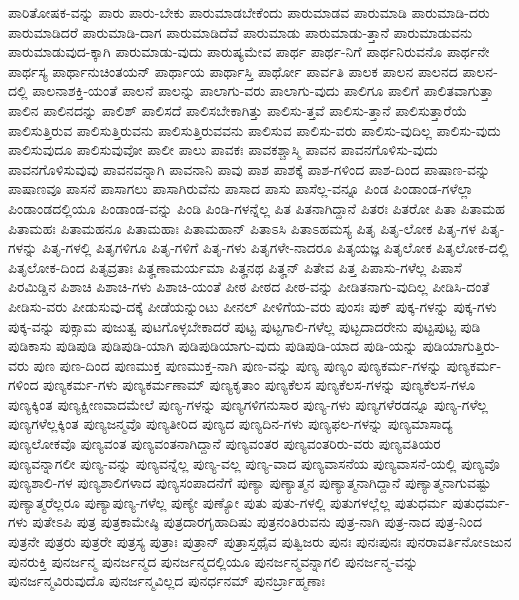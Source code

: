 {ಪಾರಿತೋಷಕ-ವನ್ನು
ಪಾರು
ಪಾರು-ಬೇಕು
ಪಾರುಮಾಡಬೇಕೆಂದು
ಪಾರುಮಾಡವ
ಪಾರುಮಾಡಿ
ಪಾರುಮಾಡಿ-ದರು
ಪಾರುಮಾಡಿದರೆ
ಪಾರುಮಾಡಿ-ದಾಗ
ಪಾರುಮಾಡಿದೆವೆ
ಪಾರುಮಾಡು
ಪಾರುಮಾಡು-ತ್ತಾನೆ
ಪಾರುಮಾಡುವನು
ಪಾರುಮಾಡುವುದ-ಕ್ಕಾಗಿ
ಪಾರುಮಾಡು-ವುದು
ಪಾರುಷ್ಯಮೇವ
ಪಾರ್ಥ
ಪಾರ್ಥ-ನಿಗೆ
ಪಾರ್ಥನಿರುವನೊ
ಪಾರ್ಥನೇ
ಪಾರ್ಥಸ್ಯ
ಪಾರ್ಥಾನುಚಿಂತಯನ್
ಪಾರ್ಥಾಯ
ಪಾರ್ಥಾಸ್ತಿ
ಪಾರ್ಥೋ
ಪಾರ್ವತಿ
ಪಾಲಕ
ಪಾಲನ
ಪಾಲನದ
ಪಾಲನ-ದಲ್ಲಿ
ಪಾಲನಾಶಕ್ತಿ-ಯಂತೆ
ಪಾಲನೆ
ಪಾಲನ್ನು
ಪಾಲಾಗು-ವರು
ಪಾಲಾಗು-ವುದು
ಪಾಲಿಗೂ
ಪಾಲಿಗೆ
ಪಾಲಿತವಾಗುತ್ತಾ
ಪಾಲಿನ
ಪಾಲಿನದನ್ನು
ಪಾಲಿಶ್
ಪಾಲಿಸದೆ
ಪಾಲಿಸಬೇಕಾಗಿತ್ತು
ಪಾಲಿಸು-ತ್ತವೆ
ಪಾಲಿಸು-ತ್ತಾನೆ
ಪಾಲಿಸುತ್ತಾರೆಯೆ
ಪಾಲಿಸುತ್ತಿರುವ
ಪಾಲಿಸುತ್ತಿರುವನು
ಪಾಲಿಸುತ್ತಿರುವವನು
ಪಾಲಿಸುವ
ಪಾಲಿಸು-ವರು
ಪಾಲಿಸು-ವುದಿಲ್ಲ
ಪಾಲಿಸು-ವುದು
ಪಾಲಿಸುವುದೂ
ಪಾಲಿಸುವುವೋ
ಪಾಲೀ
ಪಾಲು
ಪಾವಕಃ
ಪಾವಕಶ್ಚಾಸ್ಮಿ
ಪಾವನ
ಪಾವನಗೊಳಿಸು-ವುದು
ಪಾವನಗೊಳಿಸುವುವು
ಪಾವನವನ್ನಾಗಿ
ಪಾವನಾನಿ
ಪಾವು
ಪಾಶ
ಪಾಶಕ್ಕೆ
ಪಾಶ-ಗಳಿಂದ
ಪಾಶ-ದಿಂದ
ಪಾಷಾಣ-ವನ್ನು
ಪಾಷಾಣವೂ
ಪಾಸನೆ
ಪಾಸಾಗಲು
ಪಾಸಾಗಿರುವೆನು
ಪಾಸಾದ
ಪಾಸು
ಪಾಸೆಲ್ಲ-ವನ್ನೂ
ಪಿಂಡ
ಪಿಂಡಾಂಡ-ಗಳೆಲ್ಲಾ
ಪಿಂಡಾಂಡದಲ್ಲಿಯೂ
ಪಿಂಡಾಂಡ-ವನ್ನು
ಪಿಂಡಿ
ಪಿಂಡಿ-ಗಳನ್ನೆಲ್ಲ
ಪಿತ
ಪಿತನಾಗಿದ್ದಾನೆ
ಪಿತರಃ
ಪಿತರೋ
ಪಿತಾ
ಪಿತಾಮಹ
ಪಿತಾಮಹಃ
ಪಿತಾಮಹನೂ
ಪಿತಾಮಹಾಃ
ಪಿತಾಮಹಾನ್
ಪಿತಾಽಸಿ
ಪಿತಾಽಹಮಸ್ಯ
ಪಿತೃ
ಪಿತೃ-ಲೋಕ
ಪಿತೃ-ಗಳ
ಪಿತೃ-ಗಳನ್ನು
ಪಿತೃ-ಗಳಲ್ಲಿ
ಪಿತೃಗಳಿಗೂ
ಪಿತೃ-ಗಳಿಗೆ
ಪಿತೃ-ಗಳು
ಪಿತೃಗಳೇ-ನಾದರೂ
ಪಿತೃಯಜ್ಞ
ಪಿತೃಲೋಕ
ಪಿತೃಲೋಕ-ದಲ್ಲಿ
ಪಿತೃಲೋಕ-ದಿಂದ
ಪಿತೃವ್ರತಾಃ
ಪಿತೄಣಾಮರ್ಯಮಾ
ಪಿತೄನಥ
ಪಿತೄನ್
ಪಿತೇವ
ಪಿತ್ತ
ಪಿಪಾಸು-ಗಳೆಲ್ಲ
ಪಿಪಾಸೆ
ಪಿರಮಿಡ್ಡಿನ
ಪಿಶಾಚಿ
ಪಿಶಾಚಿ-ಗಳು
ಪಿಶಾಚಿ-ಯಂತೆ
ಪೀಠ
ಪೀಠದ
ಪೀಠ-ವನ್ನು
ಪೀಡಿತನಾಗು-ವುದಿಲ್ಲ
ಪೀಡಿಸಿ-ದಂತೆ
ಪೀಡಿಸು-ವರು
ಪೀಡುಸುವು-ದಕ್ಕೆ
ಪೀಡೆಯನ್ನುಂಟು
ಪೀನಲ್
ಪೀಳಿಗೆಯ-ವರು
ಪುಂಸಃ
ಪುಕ್
ಪುಕ್ಕ-ಗಳನ್ನು
ಪುಕ್ಕ-ಗಳು
ಪುಕ್ಕ-ವನ್ನು
ಪುಕ್ಸಾಮ
ಪುಜುತ್ವ
ಪುಟಗೊಳ್ಳಬೇಕಾದರೆ
ಪುಟ್ಟ
ಪುಟ್ಟಗಾಲಿ-ಗಳೆಲ್ಲ
ಪುಟ್ಟದಾದರೇನು
ಪುಟ್ಟಪುಟ್ಟ
ಪುಡಿ
ಪುಡಿಕಾಸು
ಪುಡಿಪುಡಿ
ಪುಡಿಪುಡಿ-ಯಾಗಿ
ಪುಡಿಪುಡಿಯಾಗು-ವುದು
ಪುಡಿಪುಡಿ-ಯಾದ
ಪುಡಿ-ಯನ್ನು
ಪುಡಿಯಾಗುತ್ತಿರು-ವರು
ಪುಣ
ಪುಣ-ದಿಂದ
ಪುಣಮುಕ್ತ
ಪುಣಮುಕ್ತ-ನಾಗಿ
ಪುಣ-ವನ್ನು
ಪುಣ್ಯ
ಪುಣ್ಯಂ
ಪುಣ್ಯಕರ್ಮ-ಗಳನ್ನು
ಪುಣ್ಯಕರ್ಮ-ಗಳಿಂದ
ಪುಣ್ಯಕರ್ಮ-ಗಳು
ಪುಣ್ಯಕರ್ಮಣಾಮ್
ಪುಣ್ಯಕೃತಾಂ
ಪುಣ್ಯಕೆಲಸ
ಪುಣ್ಯಕೆಲಸ-ಗಳನ್ನು
ಪುಣ್ಯಕೆಲಸ-ಗಳೂ
ಪುಣ್ಯಕ್ಕಿಂತ
ಪುಣ್ಯಕ್ಷೀಣವಾದಮೇಲೆ
ಪುಣ್ಯ-ಗಳನ್ನು
ಪುಣ್ಯಗಳಿಗನುಸಾರ
ಪುಣ್ಯ-ಗಳು
ಪುಣ್ಯಗಳೆರಡನ್ನೂ
ಪುಣ್ಯ-ಗಳೆಲ್ಲ
ಪುಣ್ಯಗಳೆಲ್ಲಕ್ಕಿಂತ
ಪುಣ್ಯಜನ್ಮವೊ
ಪುಣ್ಯತೀರಿದ
ಪುಣ್ಯದ
ಪುಣ್ಯದಿನ-ಗಳು
ಪುಣ್ಯಫಲ-ಗಳನ್ನು
ಪುಣ್ಯಮಾಸಾದ್ಯ
ಪುಣ್ಯಲೋಕವೊ
ಪುಣ್ಯವಂತ
ಪುಣ್ಯವಂತನಾಗಿದ್ದಾನೆ
ಪುಣ್ಯವಂತರ
ಪುಣ್ಯವಂತರಿರು-ವರು
ಪುಣ್ಯವತಿಯರ
ಪುಣ್ಯವನ್ನಾಗಲೀ
ಪುಣ್ಯ-ವನ್ನು
ಪುಣ್ಯವನ್ನೆಲ್ಲ
ಪುಣ್ಯ-ವಲ್ಲ
ಪುಣ್ಯ-ವಾದ
ಪುಣ್ಯವಾಸನೆಯ
ಪುಣ್ಯವಾಸನೆ-ಯಲ್ಲಿ
ಪುಣ್ಯವೊ
ಪುಣ್ಯಶಾಲಿ-ಗಳ
ಪುಣ್ಯಶಾಲಿಗಳಾದ
ಪುಣ್ಯಸಂಪಾದನೆಗೆ
ಪುಣ್ಯಾ
ಪುಣ್ಯಾತ್ಮನ
ಪುಣ್ಯಾತ್ಮನಾಗಿದ್ದಾನೆ
ಪುಣ್ಯಾತ್ಮನಾಗುವಷ್ಟು
ಪುಣ್ಯಾತ್ಮರೆಲ್ಲರೂ
ಪುಣ್ಯಾಪುಣ್ಯ-ಗಳೆಲ್ಲ
ಪುಣ್ಯೇ
ಪುಣ್ಯೋ
ಪುತು
ಪುತು-ಗಳಲ್ಲಿ
ಪುತುಗಳಲ್ಲೆಲ್ಲ
ಪುತುಧರ್ಮ
ಪುತುಧರ್ಮ-ಗಳು
ಪುತೇಽಪಿ
ಪುತ್ರ
ಪುತ್ರಕಾಮೇಷ್ಠಿ
ಪುತ್ರದಾರಗೃಹಾದಿಷು
ಪುತ್ರನಂತಿರುವನು
ಪುತ್ರ-ನಾಗಿ
ಪುತ್ರ-ನಾದ
ಪುತ್ರ-ನಿಂದ
ಪುತ್ರನೇ
ಪುತ್ರರು
ಪುತ್ರರೇ
ಪುತ್ರಸ್ಯ
ಪುತ್ರಾಃ
ಪುತ್ರಾನ್
ಪುತ್ರಾಸ್ತಥೈವ
ಪುತ್ವಿಜರು
ಪುನಃ
ಪುನಃಪುನಃ
ಪುನರಾವರ್ತಿನೋಽಜುನ
ಪುನರುಕ್ತಿ
ಪುನರ್ಜನ್ಮ
ಪುನರ್ಜನ್ಮದ
ಪುನರ್ಜನ್ಮದಲ್ಲಿಯೂ
ಪುನರ್ಜನ್ಮವನ್ನಾಗಲಿ
ಪುನರ್ಜನ್ಮ-ವನ್ನು
ಪುನರ್ಜನ್ಮವಿರುವುದೊ
ಪುನರ್ಜನ್ಮವಿಲ್ಲದ
ಪುನರ್ಧನಮ್
ಪುನರ್ಬ್ರಾಹ್ಮಣಾಃ
}
